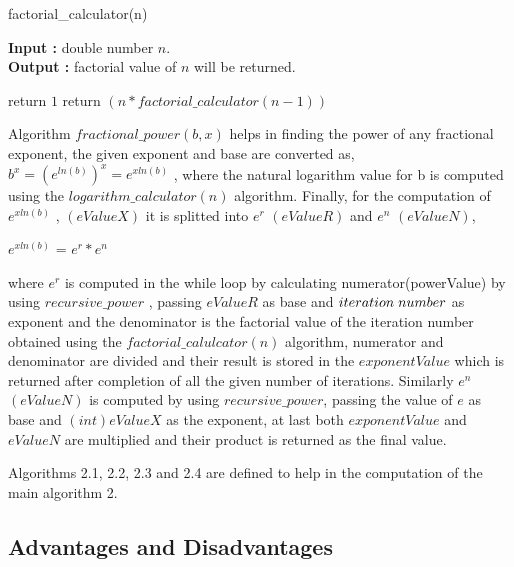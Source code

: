 \documentclass[12pt, a4paper]{article}
\begin{document}
\begin{algorithm}[hbt!]
\renewcommand{\thealgorithm}{2.4}
\caption{factorial\_calculator(n)}\label{alg:two}

\hspace*{\algorithmicindent} \textbf{Input : }double number $n$. \\
\hspace*{\algorithmicindent} \textbf{Output : }factorial value of $n$ will be returned.
\begin{algorithmic}[1]

  \STATE return $1$
\ENDIF
\STATE return $ (n * factorial\_calculator(n-1)) $

\end{algorithmic}
\end{algorithm}



\newpage
\noindent
Algorithm $fractional\_power(b,x) $ helps in finding the power of any fractional exponent, the given exponent and base are converted as, $b^x = (e^{ln(b)})^x = e^{xln(b)} $ \cite{Algorithms}, where the natural logarithm value for b is computed using the $logarithm\_calculator(n) $ algorithm. Finally, for the computation of $e^{xln(b)} $ , $(eValueX)$ it is splitted into $e^r$ $(eValueR)$ and $e^n$ $(eValueN)$,

$e^{xln(b)} $ = $e^r * e^n $ 

\noindent
 where $e^r$ is computed in the while loop by calculating numerator(powerValue) by using $recursive\_power$ , passing $eValueR$ as base and $iteration \hspace{1mm} number$ as exponent and the denominator is the factorial value of the iteration number obtained using the $factorial\_calulcator(n)$ algorithm, numerator and denominator are divided and their result is stored in the $exponentValue$ which is returned after completion of all the given number of iterations. Similarly $e^n$ $(eValueN)$ is computed by using $recursive\_power$, passing the value of $e$ as base and $(int) eValueX$ as the exponent, at last both $exponentValue$ and $eValueN$ are multiplied and their product is returned as the final value.
 
 
\noindent
Algorithms 2.1, 2.2, 2.3 and 2.4 are defined to help in the computation of the main algorithm 2.

\subsection{Advantages and Disadvantages}
\end{document}
